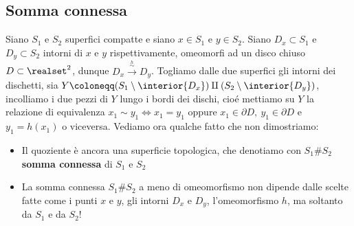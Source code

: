 	\subsection{Somma connessa}
Siano $S_1$ e $S_2$ superfici compatte e siano $x\in S_1$ e $y\in S_2$. Siano $D_x\subset S_1$ e $D_y\subset S_2$ intorni di $x$ e $y$ rispettivamente, omeomorfi ad un disco chiuso $D\subset\realset^2$, dunque $D_x\stackrel{\stackrel{h}{\sim}}{\longrightarrow} D_y$. Togliamo dalle due superfici gli intorni dei dischetti, sia $Y\coloneqq (S_1\setminus \interior{D_x})\amalg (S_2\setminus \interior{D_y})$, incolliamo i due pezzi di $Y$ lungo i bordi dei dischi, cioé mettiamo su $Y$ la relazione di equivalenza $x_1\sim y_1 \iff x_1=y_1$ oppure $x_1\in\partial{D},\ y_1\in\partial{D}$ e $y_1=h(x_1)$ o viceversa.\newline
Vediamo ora qualche fatto che non dimostriamo:
	\begin{itemize}
		\item Il quoziente è ancora una superficie topologica, che denotiamo con $S_1\# S_2$ \textbf{somma connessa} di $S_1$ e $S_2$
		\item La somma connessa $S_1\# S_2$ a meno di omeomorfismo non dipende dalle scelte fatte come i punti $x$ e $y$, gli intorni $D_x$ e $D_y$, l'omeomorfismo $h$, ma soltanto da $S_1$ e da $S_2$!
	\end{itemize}
